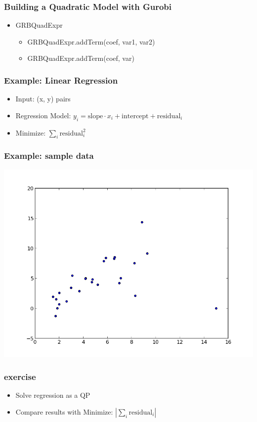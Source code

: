 \documentclass[12pt,handout]{beamer}
\begin{document}
\begin{frame}
\frametitle{Building a Quadratic Model with Gurobi}
\begin{itemize}
\item GRBQuadExpr
\begin{itemize}
\item GRBQuadExpr.addTerm(coef, var1, var2)
\end{itemize}

\begin{itemize}
\item GRBQuadExpr.addTerm(coef, var)
\end{itemize}
\end{itemize}
\end{frame}

\begin{frame}
\frametitle{Example: Linear Regression}
\begin{itemize}
  \item Input: (x, y) pairs
  \item Regression Model: $y_i = \mbox{slope} \cdot x_i + \mbox{intercept} + \mbox{residual}_i$
  \item Minimize: $\sum_i \mbox{residual}^2_i$
\end{itemize}
\end{frame}

\begin{frame}
\frametitle{Example: sample data}
\includegraphics[scale=0.5]{regression.png}
\end{frame}

\begin{frame}
  \frametitle{exercise}
  \begin{itemize}
  \item Solve regression as a QP
  \item Compare results with Minimize: $|\sum_i \mbox{residual}_i|$
  \end{itemize}
\end{frame}
\end{document}
